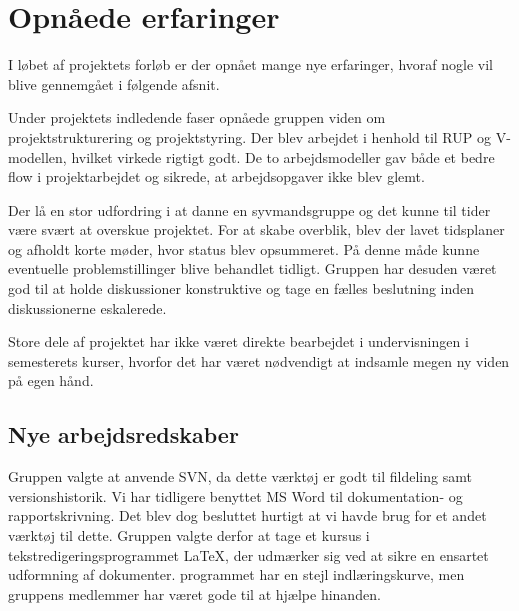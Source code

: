 \section{Opnåede erfaringer}
\label{chap:opnaaede_erfaringer}

I løbet af projektets forløb er der opnået mange nye erfaringer, hvoraf nogle vil blive gennemgået i følgende afsnit.

Under projektets indledende faser opnåede gruppen viden om projektstrukturering og projektstyring. Der blev arbejdet i henhold til RUP og V-modellen, hvilket virkede rigtigt godt. De to arbejdsmodeller gav både et bedre flow i projektarbejdet og sikrede, at arbejdsopgaver ikke blev glemt. 

Der lå en stor udfordring i at danne en syvmandsgruppe og det kunne til tider være svært at overskue projektet. For at skabe overblik, blev der lavet tidsplaner og afholdt korte møder, hvor status blev opsummeret. På denne måde kunne eventuelle problemstillinger blive behandlet tidligt.\newline
Gruppen har desuden været god til at holde diskussioner konstruktive og tage en fælles beslutning inden diskussionerne eskalerede.


Store dele af projektet har ikke været direkte bearbejdet i undervisningen i semesterets kurser, hvorfor det har været nødvendigt at indsamle megen ny viden på egen hånd.


\subsection{Nye arbejdsredskaber}
Gruppen valgte at anvende SVN, da dette værktøj er godt til fildeling samt versionshistorik. Vi har tidligere benyttet MS Word til dokumentation- og rapportskrivning. Det blev dog besluttet hurtigt at vi havde brug for et andet værktøj til dette. Gruppen valgte derfor at tage et kursus i tekstredigeringsprogrammet LaTeX, der udmærker sig ved at sikre en ensartet udformning af dokumenter. programmet har en stejl indlæringskurve, men gruppens medlemmer har været gode til at hjælpe hinanden.